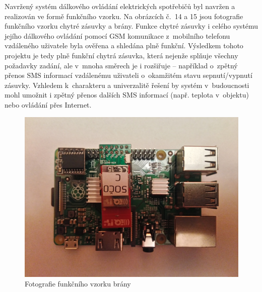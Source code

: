 \documentclass[12pt,a4paper,oneside]{article}
\begin{document}

Navržený systém dálkového ovládání elektrických spotřebičů byl navržen a realizován ve formě funkčního vzorku. Na obrázcích č.~14 a 15 jsou fotografie funkčního vzorku chytré zásuvky a brány. Funkce chytré zásuvky i celého systému jejího dálkového ovládání pomocí GSM komunikace z~mobilního telefonu vzdáleného uživatele byla ověřena a shledána plně funkční. Výsledkem tohoto projektu je tedy plně funkční chytrá zásuvka, která nejenže splňuje všechny požadavky zadání, ale v~mnoha směrech je i rozšiřuje – například o~zpětný přenos SMS informací vzdálenému uživateli o~okamžitém stavu sepnutí/vypnutí zásuvky. Vzhledem k~charakteru a univerzalitě řešení by systém v~budoucnosti mohl umožnit i zpětný přenos dalších SMS informací (např. teplota v~objektu) nebo ovládání přes Internet.

\begin{figure}[H]
\centering
\label{fig:foto/brana}
\includegraphics[width = 128mm]{../img/foto/brana.jpg}
\caption{Fotografie funkčního vzorku brány}
\end{figure}
\end{document}
